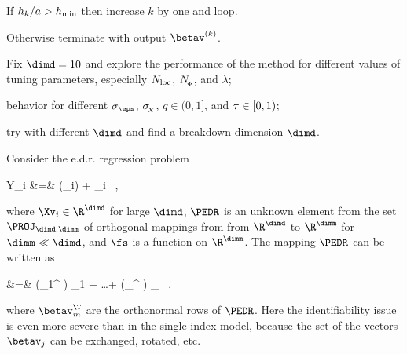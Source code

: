 \begin{mylist}
\item
If \( h_{k}/a > h_{\min} \) then increase \( k \) by one and loop.

\item
Otherwise terminate with output \( \betav^{(k)} \).
\end{mylist}


{\color{blue} 
\begin{mylist}
\item
Fix \( \dimd = 10 \) and explore the performance of the method 
for different values of tuning parameters, especially \( N_{\operatorname{loc}} \), \( N_{_{\! \Phi}} \), and \( \lambda \);

\item
behavior for different \( \sigma_{\eps} \), \( \sigma_{\!_{X}} \), \( q \in (0,1] \), and \( \tau \in [0,1) \);

\item
try with different \( \dimd \) and find a breakdown dimension \( \dimd \).

\end{mylist}
 
}



\label{Smultind}


Consider the e.d.r. regression problem
\begin{EQA}
	Y_{i}
	&=&
	\fs(\PEDR \Xv_{i}) + \eps_{i}
	\, ,
\label{YifXieiedr}
\end{EQA}
where \( \Xv_{i} \in \R^{\dimd} \) for large \( \dimd \), 
\( \PEDR \) is an unknown element from the set \( \PROJ_{\dimd,\dimm} \) 
of orthogonal mappings from 
from \( \R^{\dimd} \) to \( \R^{\dimm} \) for \( \dimm \ll \dimd \), and
\( \fs \) is a function on \( \R^{\dimm} \).
The mapping \( \PEDR \) can be written as 
\begin{EQA}
	\PEDR \xv
	&=&
	(\betav_{1}^{\T} \xv) \betav_{1} + \ldots + (\betav_{\dimm}^{\T} \xv) \betav_{\dimm}
	\, ,
\label{ydgenb8jejohkou90tkr}
\end{EQA}
where \( \betav_{m}^{\T} \) are the orthonormal rows of \( \PEDR \).
Here the identifiability issue is even more severe than in the single-index model, because 
the set of the vectors \( \betav_{j} \) can be exchanged, rotated, etc. 

